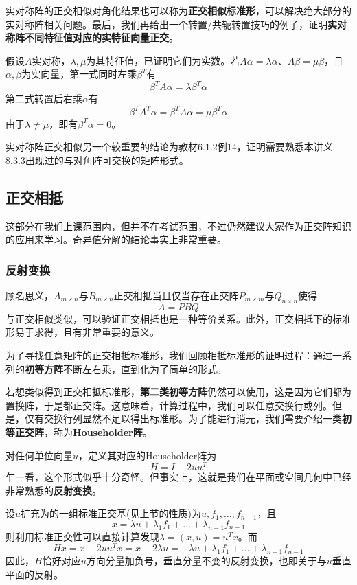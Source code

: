\documentclass[a4paper,UTF8,fontset=windows]{ctexart}
\newcommand*{\note}{\noindent *}
\begin{document}
实对称阵的正交相似对角化结果也可以称为\textbf{正交相似标准形}，可以解决绝大部分的实对称阵相关问题。最后，我们再给出一个转置/共轭转置技巧的例子，证明\textbf{实对称阵不同特征值对应的实特征向量正交}。

假设$A$实对称，$\lambda,\mu$为其特征值，已证明它们为实数。若$A\alpha=\lambda\alpha$、$A\beta=\mu\beta$，且$\alpha,\beta$为实向量，第一式同时左乘$\beta^T$有
$$\beta^TA\alpha=\lambda\beta^T\alpha$$
第二式转置后右乘$\alpha$有
$$\beta^TA^T\alpha=\beta^TA\alpha=\mu\beta^T\alpha$$
由于$\lambda\ne\mu$，即有$\beta^T\alpha=0$。

\note 实对称阵正交相似另一个较重要的结论为教材6.1.2例14，证明需要熟悉本讲义8.3.3出现过的与对角阵可交换的矩阵形式。

\subsection{正交相抵}
\note 这部分在我们上课范围内，但并不在考试范围，不过仍然建议大家作为正交阵知识的应用来学习。奇异值分解的结论事实上非常重要。

\subsubsection{反射变换}
顾名思义，$A_{m\times n}$与$B_{m\times n}$正交相抵当且仅当存在正交阵$P_{m\times m}$与$Q_{n\times n}$使得
$$A=PBQ$$
与正交相似类似，可以验证正交相抵也是一种等价关系。此外，正交相抵下的标准形易于求得，且有非常重要的意义。

为了寻找任意矩阵的正交相抵标准形，我们回顾相抵标准形的证明过程：通过一系列的\textbf{初等方阵}不断左右乘，直到化为了简单的形式。

若想类似得到正交相抵标准形，\textbf{第二类初等方阵}仍然可以使用，这是因为它们都为置换阵，于是都正交阵。这意味着，计算过程中，我们可以任意交换行或列。但是，仅有交换行列显然不足以得出标准形。为了能进行消元，我们需要介绍一类\textbf{初等正交阵}，称为\textbf{Householder阵}。

对任何单位向量$u$，定义其对应的Householder阵为
$$H=I-2uu^T$$
乍一看，这个形式似乎十分奇怪。但事实上，这就是我们在平面或空间几何中已经非常熟悉的\textbf{反射变换}。

设$u$扩充为的一组标准正交基(见上节的性质)为$u,f_1,\dots,f_{n-1}$，且
$$x=\lambda u+\lambda_1f_1+\dots+\lambda_{n-1}f_{n-1}$$
则利用标准正交性可以直接计算发现$\lambda=(x,u)=u^Tx$。而
$$Hx=x-2uu^Tx=x-2\lambda u=-\lambda u+\lambda_1f_1+\dots+\lambda_{n-1}f_{n-1}$$
因此，$H$恰好对应$u$方向分量加负号，垂直分量不变的反射变换，也即关于与$u$垂直平面的反射。
\end{document}
